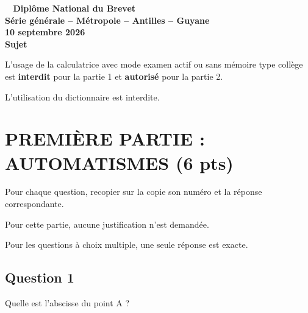 \documentclass[12pt,a4paper,french]{article}
\renewcommand{\i}{\mathrm{\,i\,}}
\begin{document}
\pagestyle{fancy}

\thispagestyle{empty}


\begin{center}
{\Large \textbf{
		\decofourleft~ Diplôme National du Brevet ~\decofourright\\[10pt]
		Série générale -- Métropole -- Antilles -- Guyane
		\\[10pt]
		 10 septembre 2026\\[10 pt]
		Sujet\\[10pt]}}
\end{center}

L'usage de la calculatrice avec mode examen actif ou sans mémoire \og type collège \fg{} est \textbf{interdit} pour la partie 1 et \textbf{autorisé} pour la partie 2.

L'utilisation du dictionnaire est interdite.

\bigskip

\section*{\centering PREMIÈRE PARTIE : AUTOMATISMES (6 pts)}

Pour chaque question, recopier sur la copie son numéro et la réponse correspondante.

Pour cette partie, aucune justification n'est demandée.

Pour les questions à choix multiple, une seule réponse est exacte.

\subsection*{Question 1}

Quelle est l'abscisse du point A ?

\begin{center}
\end{center}
\end{document}
